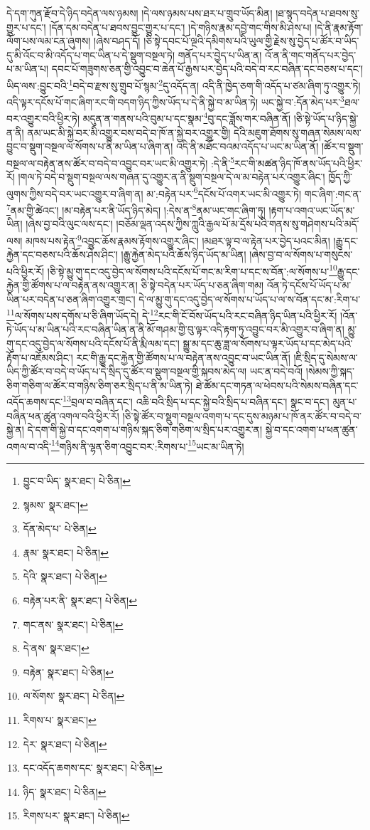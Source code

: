 དེ་དག་ཀུན་རྫོབ་དེ་ཉིད་བདེན་ལས་ཉམས། །དེ་ལས་ཉམས་པས་ཐར་པ་གྲུབ་ཡོད་མིན། །ཐ་སྙད་བདེན་པ་ཐབས་སུ་གྱུར་པ་དང་། །དོན་དམ་བདེན་པ་ཐབས་བྱུང་གྱུར་པ་དང་། །དེ་གཉིས་རྣམ་དབྱེ་གང་གིས་མི་ཤེས་པ། །དེ་ནི་རྣམ་རྟོག་ལོག་པས་ལམ་ངན་ཞུགས། །ཞེས་བཤད་དོ། །ཅི་སྟེ་དབང་པོ་ལྔའི་དམིགས་པའི་ཡུལ་གྱི་རྗེས་སུ་བྱེད་པ་ཚོར་བ་ཡིད་དུ་མི་འོང་བ་མི་འདོད་པ་གང་ཡིན་པ་དེ་སྡུག་བསྔལ་ཏེ། གནོད་པར་བྱེད་པ་ཡིན་ན། འོ་ན་ནི་གང་གནོད་པར་བྱེད་པ་མ་ཡིན་པ། དབང་པོ་གཟུགས་ཅན་གྱི་འབྱུང་བ་ཆེན་པོ་རྒྱས་པར་བྱེད་པའི་བདེ་བ་རང་བཞིན་དང་བཅས་པ་དང་། ཡིད་ལས་:བྱུང་བའི་\footnote{བྱུང་བ་ཡིད་  སྣར་ཐང་།  པེ་ཅིན། }བདེ་བ་རྫས་སུ་གྲུབ་པོ་སྙམ་\footnote{སྙམས་  སྣར་ཐང་། }དུ་འདོད་ན། འདི་ནི་ཁྱེད་ཅག་གི་འདོད་པ་ཙམ་ཞིག་ཏུ་འགྱུར་ཏེ། འདི་ལྟར་དངོས་པོ་གང་ཞིག་རང་གི་བདག་ཉིད་ཀྱིས་ཡོད་པ་དེ་ནི་སྐྱེ་བ་མ་ཡིན་ཏེ། ཡང་སྐྱེ་བ་:དོན་མེད་པར་\footnote{དོན་མེད་པ་  པེ་ཅིན། }ཐལ་བར་འགྱུར་བའི་ཕྱིར་ཏེ། མདུན་ན་གནས་པའི་བུམ་པ་དང་སྣམ་\footnote{རྣམ་  སྣར་ཐང་།  པེ་ཅིན། }བུ་དང་ཟློས་གར་བཞིན་ནོ། །ཅི་སྟེ་ཡོད་པ་ཉིད་སྐྱེ་ན་ནི། ནམ་ཡང་མི་སྐྱེ་བར་མི་འགྱུར་བས་བདེ་བ་ཁོ་ན་སྐྱེ་བར་འགྱུར་གྱི། དེའི་མཇུག་ཐོགས་སུ་གཞན་སེམས་ལས་བྱུང་བ་སྡུག་བསྔལ་ལ་སོགས་པ་ནི་མ་ཡིན་པ་ཞིག་ན། འདི་ནི་མཐོང་བའམ་འདོད་པ་ཡང་མ་ཡིན་ནོ། །ཚོར་བ་སྡུག་བསྔལ་ལ་བརྟེན་ནས་ཚོར་བ་བདེ་བ་འབྱུང་བར་ཡང་མི་འགྱུར་ཏེ། :དེ་ནི་\footnote{དེའི་  སྣར་ཐང་།  པེ་ཅིན། }རང་གི་མཚན་ཉིད་ཁོ་ནས་ཡོད་པའི་ཕྱིར་རོ། །གལ་ཏེ་བདེ་བ་སྡུག་བསྔལ་ལས་གཞན་དུ་འགྱུར་ན་ནི་སྡུག་བསྔལ་དེ་ལ་མ་བརྟེན་པར་འགྱུར་ཞིང་། ཁྱོད་ཀྱི་ལུགས་ཀྱིས་བདེ་བར་ཡང་འགྱུར་བ་ཞིག་ན། མ་:བརྟེན་པར་\footnote{བརྟེན་པར་ནི་  སྣར་ཐང་།  པེ་ཅིན། }དངོས་པོ་འགར་ཡང་མི་འགྱུར་ཏེ། གང་ཞིག་:གང་ན་\footnote{གང་ནས་  སྣར་ཐང་།  པེ་ཅིན། }ནམ་གྱི་ཚེའང་། །མ་བརྟེན་པར་ནི་ཡོད་ཉིད་མེད། །:དེས་ན་\footnote{དེ་ནས་  སྣར་ཐང་། }ནམ་ཡང་གང་ཞིག་ཏུ། །རྟག་པ་འགའ་ཡང་ཡོད་མ་ཡིན། །ཞེས་བྱ་བའི་ལུང་ལས་དང་། །བཅོམ་ལྡན་འདས་ཀྱིས་ཀླུའི་རྒྱལ་པོ་མ་དྲོས་པའི་གནས་སུ་གཤེགས་པའི་མདོ་ལས། མཁས་པས་རྟེན་\footnote{བརྟེན་  སྣར་ཐང་།  པེ་ཅིན། }འབྱུང་ཆོས་རྣམས་རྟོགས་འགྱུར་ཞིང་། །མཐར་ལྟ་བ་ལ་རྟེན་པར་བྱེད་པའང་མིན། །རྒྱུ་དང་རྐྱེན་དང་བཅས་པའི་ཆོས་ཤེས་ཤིང་། །རྒྱུ་རྐྱེན་མེད་པའི་ཆོས་ཉིད་ཡོད་མ་ཡིན། །ཞེས་བྱ་བ་ལ་སོགས་པ་གསུངས་པའི་ཕྱིར་རོ། །ཅི་སྟེ་མྱུ་གུ་དང་འདུ་བྱེད་ལ་སོགས་པའི་དངོས་པོ་གང་མ་རིག་པ་དང་ས་བོན་:ལ་སོགས་པ་\footnote{ལ་སོགས་  སྣར་ཐང་།  པེ་ཅིན། }རྒྱུ་དང་རྐྱེན་གྱི་ཚོགས་པ་ལ་བརྟེན་ནས་འགྱུར་ན། ཅི་སྟེ་བདེན་པར་ཡོད་པ་ཅན་ཞིག་གམ། འོན་ཏེ་དངོས་པོ་ཡོད་པ་མ་ཡིན་པར་བདེན་པ་ཅན་ཞིག་འགྱུར་གྲང་། དེ་ལ་མྱུ་གུ་དང་འདུ་བྱེད་ལ་སོགས་པ་ཡོད་པ་ལ་ས་བོན་དང་མ་:རིག་པ་\footnote{རིགས་པ་  སྣར་ཐང་། }ལ་སོགས་པས་དགོས་པ་ཅི་ཞིག་ཡོད་དེ། དེ་\footnote{དེར་  སྣར་ཐང་།  པེ་ཅིན། }རང་གི་ངོ་བོས་ཡོད་པའི་རང་བཞིན་ཉིད་ཡིན་པའི་ཕྱིར་རོ། །འོན་ཏེ་ཡོད་པ་མ་ཡིན་པའི་རང་བཞིན་ཡིན་ན་ནི་མོ་གཤམ་གྱི་བུ་ལྟར་འདི་རྟག་ཏུ་འབྱུང་བར་མི་འགྱུར་བ་ཞིག་ན། མྱུ་གུ་དང་འདུ་བྱེད་ལ་སོགས་པའི་དངོས་པོ་ནི་རྨི་ལམ་དང་། སྒྱུ་མ་དང་ཆུ་ཟླ་ལ་སོགས་པ་ལྟར་ཡོད་པ་དང་མེད་པའི་རྟོག་པ་འཇོམས་ཤིང་། རང་གི་རྒྱུ་དང་རྐྱེན་གྱི་ཚོགས་པ་ལ་བརྟེན་ནས་འབྱུང་བ་ཡང་ཡིན་ནོ། །ཇི་སྲིད་དུ་སེམས་ལ་ཡིད་ཀྱི་ཚོར་བ་བདེ་བ་ཡོད་པ་དེ་སྲིད་དུ་ཚོར་བ་སྡུག་བསྔལ་གྱི་སྐབས་མེད་ལ། ཡང་ན་བདེ་བའོ། །སེམས་ཀྱི་སྐད་ཅིག་གཅིག་ལ་ཚོར་བ་གཉིས་ཅིག་ཅར་སྲིད་པ་ནི་མ་ཡིན་ཏེ། ཐེ་ཚོམ་དང་གཏན་ལ་ཕེབས་པའི་སེམས་བཞིན་དང་འདོད་ཆགས་དང་\footnote{དང་འདོད་ཆགས་དང་  སྣར་ཐང་།  པེ་ཅིན། }བྲལ་བ་བཞིན་དང་། འཆི་བའི་སྲིད་པ་དང་སྐྱེ་བའི་སྲིད་པ་བཞིན་དང་། སྣང་བ་དང་། མུན་པ་བཞིན་ཕན་ཚུན་འགལ་བའི་ཕྱིར་རོ། །ཅི་སྟེ་ཚོར་བ་སྡུག་བསྔལ་འགག་པ་དང་དུས་མཉམ་པ་ཁོ་ནར་ཚོར་བ་བདེ་བ་སྐྱེ་ན། དེ་དག་གི་སྐྱེ་བ་དང་འགག་པ་གཉིས་སྐད་ཅིག་གཅིག་ལ་སྲིད་པར་འགྱུར་ན། སྐྱེ་བ་དང་འགག་པ་ཕན་ཚུན་འགལ་བ་འདི་\footnote{ཉིད་  སྣར་ཐང་།  པེ་ཅིན། }གཉིས་ནི་ལྷན་ཅིག་འབྱུང་བར་:རིགས་པ་\footnote{རིགས་པར་  སྣར་ཐང་།  པེ་ཅིན། }ཡང་མ་ཡིན་ཏེ། 